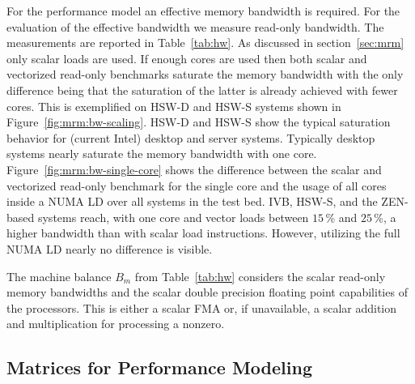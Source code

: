 For the performance model an effective memory bandwidth is required.
For the evaluation of the effective bandwidth we measure read-only bandwidth.
The measurements are reported in Table~\ref{tab:hw}.
As discussed in section~\ref{sec:mrm} only scalar loads are used.
%
If enough cores are used then both scalar and vectorized read-only benchmarks
saturate the memory bandwidth with the only difference being that the saturation of
the latter is already achieved with fewer cores.
This is exemplified on HSW-D and HSW-S systems shown in
Figure~\ref{fig:mrm:bw-scaling}.
HSW-D and HSW-S show the typical saturation behavior for (current Intel) desktop
and server systems.
Typically desktop systems nearly saturate the memory bandwidth with one core.
%
Figure~\ref{fig:mrm:bw-single-core} shows the difference between the scalar and
vectorized read-only benchmark for the single core and the usage of all cores
inside a NUMA LD over all systems in the test bed.
IVB, HSW-S, and the ZEN-based
systems reach,
with one core and vector loads between $15$\,\% and
$25$\,\%,
a higher bandwidth
than with scalar load instructions.
However, utilizing the full NUMA LD nearly no difference is visible.
%

The machine balance $B_m$ from Table~\ref{tab:hw} considers the scalar read-only
memory bandwidths and the scalar double precision floating point capabilities of
the processors.
This is either a scalar FMA or, if unavailable, a scalar addition and
multiplication for processing a nonzero.

\subsection{Matrices for Performance Modeling}

